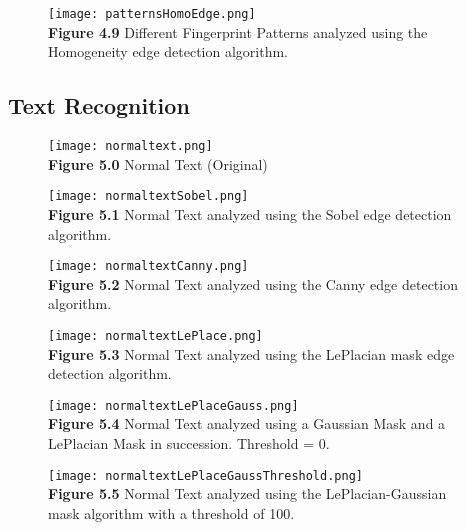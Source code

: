 \documentclass{article}%
\begin{document}
\newpage
\begin{figure}[h]
\centering
\texttt{[image: patternsHomoEdge.png]}\\
{\bf Figure 4.9} Different Fingerprint Patterns analyzed using the Homogeneity edge detection algorithm.  
\end{figure}

\clearpage

\subsection{Text Recognition}
\begin{figure}[h]
\centering
\texttt{[image: normaltext.png]}\\
{\bf Figure 5.0} Normal Text (Original)
\end{figure}

\newpage
\begin{figure}[h]
\centering
\texttt{[image: normaltextSobel.png]}\\
{\bf Figure 5.1} Normal Text analyzed using the Sobel edge detection algorithm.   
\end{figure}

\newpage
\begin{figure}[h]
\centering
\texttt{[image: normaltextCanny.png]}\\
{\bf Figure 5.2} Normal Text analyzed using the Canny edge detection algorithm.   
\end{figure}

\newpage
\begin{figure}[h]
\centering
\texttt{[image: normaltextLePlace.png]}\\
{\bf Figure 5.3} Normal Text analyzed using the LePlacian mask edge detection algorithm.  
\end{figure}

\newpage
\begin{figure}[h]
\centering
\texttt{[image: normaltextLePlaceGauss.png]}\\
{\bf Figure 5.4} Normal Text analyzed using a Gaussian Mask and a LePlacian Mask in succession. Threshold = 0.   
\end{figure}

\newpage
\begin{figure}[h]
\centering
\texttt{[image: normaltextLePlaceGaussThreshold.png]}\\
{\bf Figure 5.5} Normal Text analyzed using the LePlacian-Gaussian mask algorithm with a threshold of 100.  
\end{figure}
\end{document}
